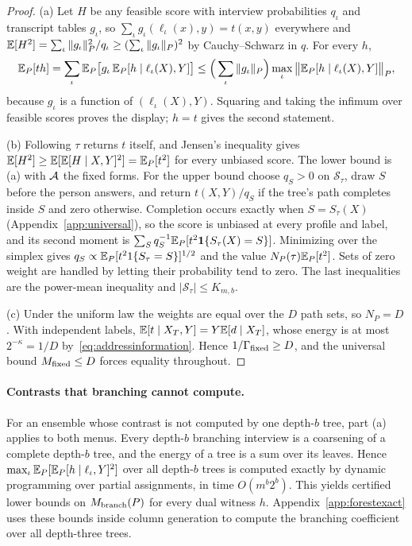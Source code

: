 \begin{proof}
(a) Let $H$ be any feasible score with interview probabilities $q_\iota$ and
transcript tables $g_\iota$, so $\sum_\iota g_\iota(\ell_\iota(x),y)=t(x,y)$
everywhere and $\mathbb{E}[H^2]=\sum_\iota\|g_\iota\|_P^2/q_\iota\ge(\sum_\iota\|g_\iota\|_P)^2$
by Cauchy--Schwarz in $q$. For every $h$,
\[
 \mathbb{E}_P[th]=\sum_\iota\mathbb{E}_P\big[g_\iota\,\mathbb{E}_P[h\mid\ell_\iota(X),Y]\big]
 \le\Big(\sum_\iota\|g_\iota\|_P\Big)\max_\iota\big\|\mathbb{E}_P[h\mid\ell_\iota(X),Y]\big\|_P,
\]
because $g_\iota$ is a function of $(\ell_\iota(X),Y)$. Squaring and taking
the infimum over feasible scores proves the display; $h=t$ gives the second
statement.

(b) Following $\tau$ returns $t$ itself, and Jensen's inequality gives
$\mathbb{E}[H^2]\ge\mathbb{E}[\mathbb{E}[H\mid X,Y]^2]=\mathbb{E}_P[t^2]$ for every unbiased score. The lower
bound is (a) with $\mathcal A$ the fixed forms. For the upper bound choose
$q_S>0$ on $\mathcal S_\tau$, draw $S$ before the person answers, and return
$t(X,Y)/q_S$ if the tree's path completes inside $S$ and zero otherwise.
Completion occurs exactly when $S=S_\tau(X)$
(Appendix~\ref{app:universal}), so the score is unbiased at every profile and
label, and its second moment is
$\sum_Sq_S^{-1}\mathbb{E}_P[t^2\mathbf 1\{S_\tau(X)=S\}]$. Minimizing over the simplex
gives $q_S\propto\mathbb{E}_P[t^21\{S_\tau=S\}]^{1/2}$ and the value
$N_P(\tau)\mathbb{E}_P[t^2]$. Sets of zero weight are handled by letting their
probability tend to zero. The last inequalities are the power-mean
inequality and $|\mathcal S_\tau|\le K_{m,b}$.

(c) Under the uniform law the weights are equal over the $D$ path sets, so
$N_P=D$. With independent labels,
$\mathbb{E}[t\mid X_T,Y]=Y\mathbb{E}[d\mid X_T]$, whose energy is at most $2^{-\kappa}=1/D$
by~\eqref{eq:addressinformation}. Hence $1/\Gamma_{\rm fixed}\ge D$, and the
universal bound $M_{\rm fixed}\le D$ forces equality throughout.
\end{proof}



\paragraph{Contrasts that branching cannot compute.}
For an ensemble whose contrast is not computed by one depth-$b$ tree, part (a)
applies to both menus. Every depth-$b$ branching interview is a coarsening of
a complete depth-$b$ tree, and the energy of a tree is a sum over its leaves.
Hence $\max_\iota\mathbb{E}_P[\mathbb{E}_P[h\mid\ell_\iota,Y]^2]$ over all depth-$b$ trees is
computed exactly by dynamic programming over partial assignments, in time
$O(m^b2^b)$. This yields certified lower bounds on $M_{\rm branch}(P)$ for every
dual witness $h$. Appendix~\ref{app:forestexact} uses these bounds inside
column generation to compute the branching coefficient over all depth-three
trees.
